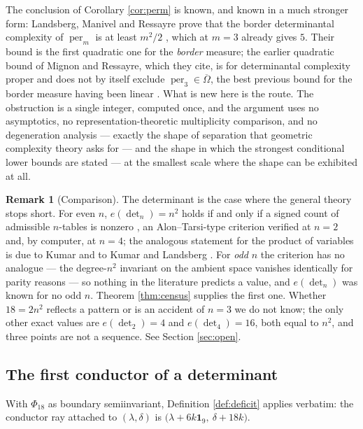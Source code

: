 \documentclass[11pt,reqno]{amsart}
\theoremstyle{plain}
\theoremstyle{definition}
\newtheorem{remark}[theorem]{Remark}
\DeclareMathOperator{\per}{per}
\newcommand{\cO}{\overline{\Omega}}
\begin{document}
The conclusion of Corollary \ref{cor:perm} is known, and known in a much
stronger form: Landsberg, Manivel and Ressayre prove that the border
determinantal complexity of $\per_m$ is at least $m^{2}/2$
\cite[Thm.~1.0.1]{LMR}, which at $m=3$ already gives $5$.  Their bound is the
first quadratic one for the \emph{border} measure; the earlier quadratic bound
of Mignon and Ressayre, which they cite, is for determinantal complexity proper
and does not by itself exclude $\per_3\in\cO$, the best previous bound for the
border measure having been linear \cite[\S1]{LMR}.  What is new here is the
route.  The obstruction is a single integer, computed once, and the argument
uses no asymptotics, no representation-theoretic
multiplicity comparison, and no degeneration analysis --- exactly the shape of
separation that geometric complexity theory asks for --- and the shape in which
the strongest conditional lower bounds are stated \cite{LR} --- at the smallest
scale
where the shape can be exhibited at all.

\begin{remark}[Comparison]\label{rem:BI}
The determinant is the case where the general theory stops short.  For even
$n$, $e(\det_n)=n^{2}$ holds if and only if a signed count of admissible
$n$-tables is nonzero \cite[Prop.~3.28]{BI}, an Alon--Tarsi-type criterion
verified at $n=2$ and, by computer, at $n=4$; the analogous statement for the
product of variables is due to Kumar and to Kumar and Landsberg
\cite{KumarComp,KL}.  For \emph{odd} $n$ the
criterion has no analogue --- the degree-$n^{2}$ invariant on the ambient space
vanishes identically for parity reasons --- so nothing in the literature
predicts a value, and $e(\det_n)$ was known for no odd $n$.  Theorem
\ref{thm:census} supplies the first one.  Whether $18=2n^{2}$ reflects a
pattern or is an accident of $n=3$ we do not know; the only other exact values
are $e(\det_2)=4$ and $e(\det_4)=16$, both equal to $n^{2}$, and three points
are not a sequence.  See Section \ref{sec:open}.
\end{remark}

\subsection*{The first conductor of a determinant}

With $\Phi_{18}$ as boundary semiinvariant, Definition \ref{def:deficit}
applies verbatim: the conductor ray attached to $(\lambda,\delta)$ is
$\big(\lambda+6k\mathbf 1_9,\ \delta+18k\big)$.
\end{document}
